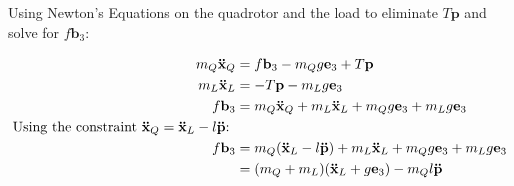 \documentclass[11pt]{article}
\begin{document}
\newpage

Using Newton's Equations on the quadrotor and the load to eliminate $T \mathbf{p}$ and solve for $f \mathbf{b}_3$:

\begin{align*}
m_Q \mathbf{\ddot{x}}_Q &= f \mathbf{b}_3 - m_Q g \mathbf{e}_3 + T \mathbf{p} \\
m_L \mathbf{\ddot{x}}_L &= - T \mathbf{p} - m_L g \mathbf{e}_3 \\ 
f \mathbf{b}_3 &= m_Q \mathbf{\ddot{x}}_Q + m_L \mathbf{\ddot{x}}_L + m_Q g \mathbf{e}_3 + m_L g \mathbf{e}_3 \\
\text{Using the constraint $ \mathbf{\ddot{x}}_Q = \mathbf{\ddot{x}}_L - l \mathbf{\ddot{p}}$: } & \\
f \mathbf{b}_3 &= m_Q (\mathbf{\ddot{x}}_L - l \mathbf{\ddot{p}}) + m_L \mathbf{\ddot{x}}_L + m_Q g \mathbf{e}_3 + m_L g \mathbf{e}_3 \\
&= (m_Q + m_L) (\mathbf{\ddot{x}}_L + g \mathbf{e}_3) - m_Q l \mathbf{\ddot{p}}
\end{align*}
\end{document}
